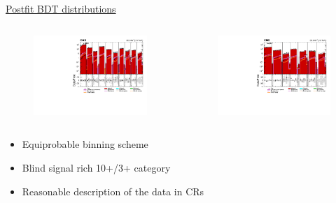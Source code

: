 \documentclass{beamer}
\begin{document}
\begin{frame}
\underline{Postfit BDT distributions} \vspace{-10pt}
\begin{columns}
	\begin{figure}
		\includegraphics[width=\linewidth]{large_stat/mu/hist_muall_origbin_pub_lin}
	\end{figure}
	\begin{figure}
		\includegraphics[width=\linewidth]{large_stat/el/hist_elall_origbin_pub_lin}
	\end{figure}
\end{columns}
	\begin{itemize}
	\item Equiprobable binning scheme
	\item Blind signal rich 10+/3+ category
	\item Reasonable description of the data in CRs
	\end{itemize}
\end{frame}
\end{document}
